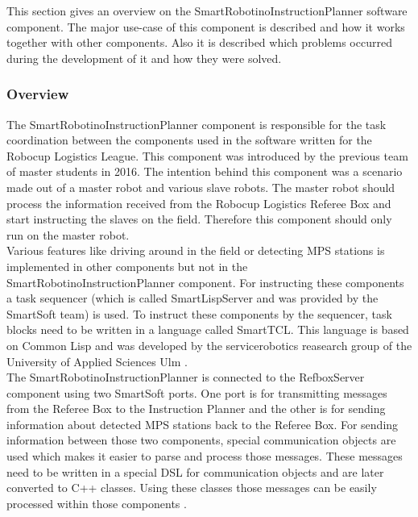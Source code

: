 This section gives an overview on the SmartRobotinoInstructionPlanner software component. The major use-case of this component is described and how it works together with other components. Also it is described which problems occurred during the development of it and how they were solved. 


\subsubsection{Overview}
\label{sec:inst_overview}

The SmartRobotinoInstructionPlanner component is responsible for the task coordination between the components used in the software written for the 
Robocup Logistics League. This component was introduced by the previous team of master students in 2016. The intention behind this component was a scenario made out of a master robot and various slave robots. The master robot should process the information received from the Robocup Logistics Referee Box and start instructing the slaves on the field. Therefore this component should only run on the master robot. \\

Various features like driving around in the field or detecting MPS stations is implemented in other components but not in the SmartRobotinoInstructionPlanner component. For instructing these components a task sequencer (which is called SmartLispServer and was provided by the SmartSoft team) is used. To instruct these components by the sequencer, task blocks need to be written in a language called SmartTCL. This language is based on Common Lisp and was developed by the servicerobotics reasearch group of the University of Applied Sciences Ulm \cite{SS10}.  \\ 

The SmartRobotinoInstructionPlanner is connected to the RefboxServer component using two SmartSoft ports. One port is for transmitting messages from the Referee Box to the Instruction Planner and the other is for sending information about detected MPS stations back to the Referee Box. For sending information between those two components, special communication objects are used which makes it easier to parse and process those messages. These messages need to be written in a special DSL for communication objects and are later converted to C++ classes. Using these classes those messages can be easily processed within those components \cite{CO}. \\


